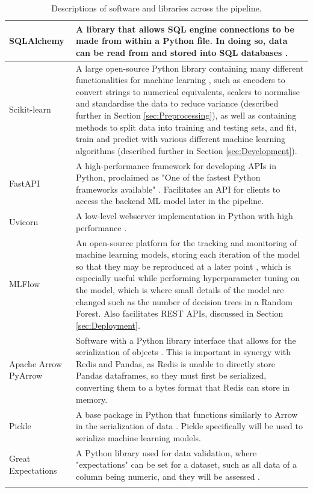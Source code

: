 \documentclass[12pt]{report}
\begin{document}
\begin{longtable}{ |p{}| p{}|}
    \hline
    SQLAlchemy &
    A library that allows SQL engine connections to be made from within a Python file. In 
    doing so, data can be read from and stored into SQL databases \autocite{sqlalchemy_sqlalchemy_nodate}.\\
    \hline
    Scikit-learn & 
    A large open-source Python library containing many different functionalities for machine learning \autocite{scikit-learn_scikit-learn_nodate}, 
    such as encoders to convert strings to numerical equivalents, scalers to normalise and standardise 
    the data to reduce variance (described further in Section \ref{sec:Preprocessing}), as well as containing 
    methods to split data into training and testing sets, and fit, train and predict with various different 
    machine learning algorithms (described further in Section \ref{sec:Development}).\\
    \hline
    FastAPI &
    A high-performance framework for developing APIs in Python, proclaimed
    as "One of the fastest Python frameworks available" \autocite{fastapi_fastapi_nodate}.
    Facilitates an API for clients to access the backend ML model later in the pipeline. \\
    \hline
    Uvicorn &
    A low-level webserver implementation in Python with high performance \autocite{uvicorn_uvicorn_nodate}.\\
    \hline
    MLFlow &
    An open-source platform for the tracking and monitoring of machine learning models, 
    storing each iteration of the model so that they may be reproduced at a later point \autocite{mlflow_mlflow_nodate},
    which is especially useful while performing hyperparameter tuning on the model, which is where 
    small details of the model are changed such as the number of decision trees in a Random Forest.
    Also facilitates REST APIs, discussed in Section \ref{sec:Deployment}.\\
    \hline
    Apache Arrow \newline PyArrow &
    Software with a Python library interface that allows for the serialization of objects \autocite{apache_streaming_nodate}. 
    This is important in synergy with Redis and Pandas, as Redis is unable to directly store Pandas dataframes, 
    so they must first be serialized, converting them to a bytes format that Redis can store in memory.\\
    \hline
    Pickle &
    A base package in Python that functions similarly to Arrow in the serialization of data \autocite{python_pickle_nodate}.
    Pickle specifically will be used to serialize machine learning models.\\
    \hline
    Great Expectations &
    A Python library used for data validation, where "expectations" can be set for a dataset, such as 
    all data of a column being numeric, and they will be assessed \autocite{gx_gx_nodate}.\\
    \hline
\caption{Descriptions of software and libraries across the pipeline.}\label{tab:softwareDescriptions}
\end{longtable}
\end{document}
